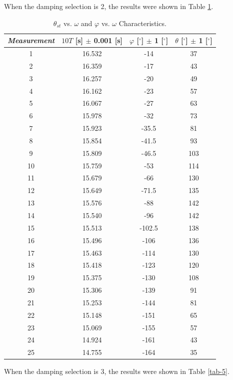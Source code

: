 \documentclass{article}
\begin{document}
When the damping selection is 2, the results were shown in Table \ref{tab-4}.
\begin{table}[!h]
\begin{center}
\begin{tabular}{|c|c|c|c|}
\hline
\textit{Measurement} & $10T$ [s] $\pm$ 0.001 [s] &
$\varphi$ [$^\circ$] $\pm$ 1 [$^\circ$] & $\theta$ [$^\circ$] $\pm$ 1 [$^\circ$]
\\
\hline
1	&	16.532	&	-14		&	37\\
2	&	16.359	&	-17		&	43\\
3	&	16.257	&	-20		&	49\\
4	&	16.162	&	-23		&	57\\
5	&	16.067	&	-27		&	63\\
6	&	15.978	&	-32		&	73\\
7	&	15.923	&	-35.5	&	81\\
8	&	15.854	&	-41.5	&	93\\
9	&	15.809	&	-46.5	&	103\\
10	&	15.759	&	-53		&	114\\
11	&	15.679	&	-66		&	130\\
12	&	15.649	&	-71.5	&	135\\
13	&	15.576	&	-88		&	142\\
14	&	15.540	&	-96		&	142\\
15	&	15.513	&	-102.5	&	138\\
16	&	15.496	&	-106	&	136\\
17	&	15.463	&	-114	&	130\\
18	&	15.418	&	-123	&	120\\
19	&	15.375	&	-130	&	108\\
20	&	15.306	&	-139	&	91\\
21	&	15.253	&	-144	&	81\\
22	&	15.148	&	-151	&	65\\
23	&	15.069	&	-155	&	57\\
24	&	14.924	&	-161	&	43\\
25	&	14.755	&	-164	&	35\\
\hline
\end{tabular}
\caption{$ \theta_{st} $ vs. $ \omega $ and $ \varphi $ vs. $ \omega $ Characteristics.}
\label{tab-4}
\end{center}
\end{table}

\newpage

When the damping selection is 3, the results were shown in Table \ref{tab-5}.
\end{document}
